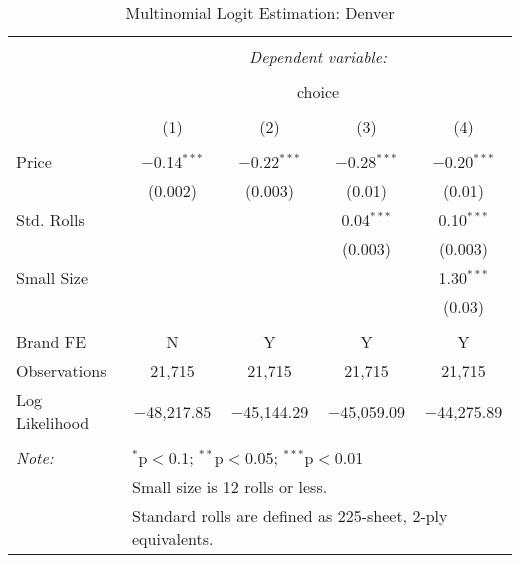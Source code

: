 
\begin{table}[!htbp] \centering 
  \caption{Multinomial Logit Estimation: Denver} 
  \label{tab:mnlDenverBaseline} 
\begin{tabular}{@{\extracolsep{5pt}}lcccc} 
\\[-1.8ex]\hline 
\hline \\[-1.8ex] 
 & \multicolumn{4}{c}{\textit{Dependent variable:}} \\ 
\cline{2-5} 
\\[-1.8ex] & \multicolumn{4}{c}{choice} \\ 
\\[-1.8ex] & (1) & (2) & (3) & (4)\\ 
\hline \\[-1.8ex] 
 Price & $-$0.14$^{***}$ & $-$0.22$^{***}$ & $-$0.28$^{***}$ & $-$0.20$^{***}$ \\ 
  & (0.002) & (0.003) & (0.01) & (0.01) \\ 
  Std. Rolls &  &  & 0.04$^{***}$ & 0.10$^{***}$ \\ 
  &  &  & (0.003) & (0.003) \\ 
  Small Size &  &  &  & 1.30$^{***}$ \\ 
  &  &  &  & (0.03) \\ 
 \hline \\[-1.8ex] 
Brand FE & N & Y & Y & Y \\ 
Observations & 21,715 & 21,715 & 21,715 & 21,715 \\ 
Log Likelihood & $-$48,217.85 & $-$45,144.29 & $-$45,059.09 & $-$44,275.89 \\ 
\hline 
\hline \\[-1.8ex] 
\textit{Note:}  & \multicolumn{4}{l}{$^{*}$p$<$0.1; $^{**}$p$<$0.05; $^{***}$p$<$0.01} \\ 
 & \multicolumn{4}{l}{Small size is 12 rolls or less.} \\ 
 & \multicolumn{4}{l}{Standard rolls are defined as 225-sheet, 2-ply equivalents.} \\ 
\end{tabular} 
\end{table} 
